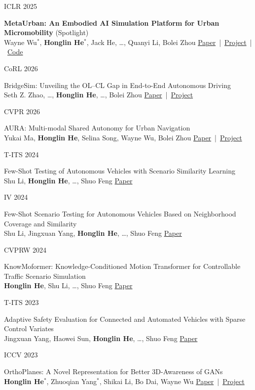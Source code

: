 \documentclass[letterpaper,10pt]{article}
\newlength{\gutter}\setlength{\gutter}{1.02in}
\newlength{\gutgap}\setlength{\gutgap}{0.14in}
\newlength{\bodycol}\setlength{\bodycol}{\textwidth-\gutter-\gutgap}
\newcommand{\entry}[2]{%
  \par\vspace{2pt}%
  \parbox[t]{\gutter}{\strut\small\color{keycol}\raggedright#1}%
  \hspace{\gutgap}%
  \parbox[t]{\bodycol}{\strut\raggedright#2}%
  \par}
\newcommand{\me}{\textbf{Honglin He}}
\newcommand{\pubtag}[1]{{\small\color{tagcol}(#1)}}
\newcommand{\links}[1]{\mbox{\small #1}}
\newcommand{\pubgroup}[1]{\par\vspace{5pt}{\bfseries #1}\par}
\begin{document}
\entry{ICLR 2025}{%
  \textbf{MetaUrban: An Embodied AI Simulation Platform for Urban Micromobility}
  \pubtag{Spotlight}\\
  Wayne Wu$^{*}$, \me$^{*}$, Jack He, \ldots, Quanyi Li, Bolei Zhou
  \quad \links{\href{https://arxiv.org/abs/2407.08725}{Paper} | \href{https://metadriverse.github.io/metaurban/}{Project} | \href{https://github.com/metadriverse/metaurban}{Code}}}

\pubgroup{Other Publications}

\entry{CoRL 2026}{\small%
  BridgeSim: Unveiling the OL--CL Gap in End-to-End Autonomous Driving\\
  Seth Z. Zhao, \ldots, \me, \ldots, Bolei Zhou
  \quad \links{\href{https://arxiv.org/abs/2604.10856}{Paper} | \href{https://vail-ucla.github.io/BridgeSim/}{Project}}}

\entry{CVPR 2026}{\small%
  AURA: Multi-modal Shared Autonomy for Urban Navigation\\
  Yukai Ma, \me, Selina Song, Wayne Wu, Bolei Zhou
  \quad \links{\href{https://vail-ucla.github.io/assets/projects/aura/AURA.pdf}{Paper} | \href{https://vail-ucla.github.io/aura/}{Project}}}

\entry{T-ITS 2024}{\small%
  Few-Shot Testing of Autonomous Vehicles with Scenario Similarity Learning\\
  Shu Li, \me, \ldots, Shuo Feng
  \quad \links{\href{https://arxiv.org/abs/2409.14369}{Paper}}}

\entry{IV 2024}{\small%
  Few-Shot Scenario Testing for Autonomous Vehicles Based on Neighborhood Coverage and Similarity\\
  Shu Li, Jingxuan Yang, \me, \ldots, Shuo Feng
  \quad \links{\href{https://arxiv.org/abs/2402.01795}{Paper}}}

\entry{CVPRW 2024}{\small%
  KnowMoformer: Knowledge-Conditioned Motion Transformer for Controllable Traffic Scenario Simulation\\
  \me, Shu Li, \ldots, Shuo Feng
  \quad \links{\href{https://agents4ad.github.io/assets/cvpr2024/papers/11.pdf}{Paper}}}

\entry{T-ITS 2023}{\small%
  Adaptive Safety Evaluation for Connected and Automated Vehicles with Sparse Control Variates\\
  Jingxuan Yang, Haowei Sun, \me, \ldots, Shuo Feng
  \quad \links{\href{https://ieeexplore.ieee.org/document/10265755}{Paper}}}

\entry{ICCV 2023}{\small%
  OrthoPlanes: A Novel Representation for Better 3D-Awareness of GANs\\
  \me$^{*}$, Zhuoqian Yang$^{*}$, Shikai Li, Bo Dai, Wayne Wu
  \quad \links{\href{https://arxiv.org/abs/2309.15830}{Paper} | \href{https://orthoplanes.github.io}{Project}}}
\end{document}
